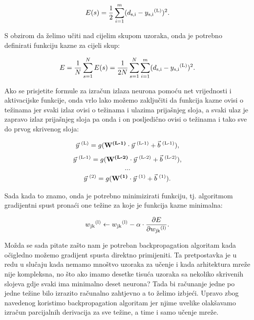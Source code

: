 \documentclass[times, utf8, zavrsni]{fer}
\begin{document}
\begin{equation}
    \label{eq:sample-err}
    E(s) = \frac{1}{2}\sum\limits_{i=1}^m(d\textsubscript{s,i} - y\textsubscript{s,i}\textsuperscript{(L)})^2.
\end{equation}

S obzirom da želimo učiti nad cijelim skupom uzoraka, onda je potrebno definirati funkciju kazne za cijeli skup:

\begin{equation}
    \label{eq:err}
    E = \frac{1}{N}\sum\limits_{s=1}^NE(s) = \frac{1}{2N}\sum\limits_{s=1}^N\sum\limits_{i=1}^m(d\textsubscript{s,i} - y\textsubscript{s,i}\textsuperscript{(L)})^2.
\end{equation}

Ako se prisjetite formule za izračun izlaza neurona pomoću net vrijednosti i aktivacijske funkcije, onda vrlo lako možemo zaključiti da funkcija kazne ovisi o težinama jer svaki izlaz ovisi o težinama i ulazima prijašnjeg sloja, a svaki ulaz je zapravo izlaz prijašnjeg sloja pa onda i on posljedično ovisi o težinama i tako sve do prvog skrivenog sloja:

\[
    \vec{y}\textsuperscript{ (L)} = g(\textbf{W\textsuperscript{(L-1)}} \cdot{\vec{y}\textsuperscript{ (L-1)}} + \vec{b}\textsuperscript{ (L-1)}),
\]
\[
    \vec{y}\textsuperscript{ (L-1)} = g(\textbf{W\textsuperscript{(L-2)}} \cdot{\vec{y}\textsuperscript{ (L-2)}} + \vec{b}\textsuperscript{ (L-2)}),
\]
\[
    \dots
\]
\[
    \vec{y}\textsuperscript{ (2)} = g(\textbf{W\textsuperscript{(1)}} \cdot{\vec{y}\textsuperscript{ (1)}} + \vec{b}\textsuperscript{ (1)}).
\]

Sada kada to znamo, onda je potrebno minimizirati funkciju, tj. algoritmom gradijentni spust pronaći one težine za koje je funkcija kazne minimalna:

\begin{equation}
    \label{eq:weight-grad}
    w\textsubscript{jk}\textsuperscript{(l)} \leftarrow  w\textsubscript{jk}\textsuperscript{(l)} - \alpha \cdot{\frac{\partial E}{\partial w\textsubscript{jk}\textsuperscript{(l)}}}.
\end{equation}

Možda se sada pitate zašto nam je potreban backpropagation algoritam kada očigledno možemo gradijent spusta direktno primijeniti. Ta pretpostavka je u redu u slučaju kada nemamo mnoštvo uzoraka za učenje i kada arhitektura mreže nije kompleksna, no što ako imamo desetke tisuća uzoraka sa nekoliko skrivenih slojeva gdje svaki ima minimalno deset neurona? Tada bi računanje jedne po jedne težine bilo izrazito računalno zahtjevno a to želimo izbjeći. Upravo zbog navedenog koristimo backpropagation algoritam jer njime uvelike olakšavamo izračun parcijalnih derivacija za sve težine, a time i samo učenje mreže.
\end{document}
